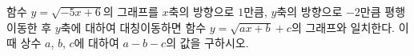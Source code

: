 함수 $y=\sqrt{-5x+6}$의 그래프를 $x$축의 방향으로 $1$만큼, $y$축의 방향으로 $-2$만큼 평행이동한 후 $y$축에 대하여 대칭이동하면 함수 $y=\sqrt{ax+b}+c$의 그래프와 일치한다. 이때 상수 $a$, $b$, $c$에 대하여 $a-b-c$의 값을 구하시오.

